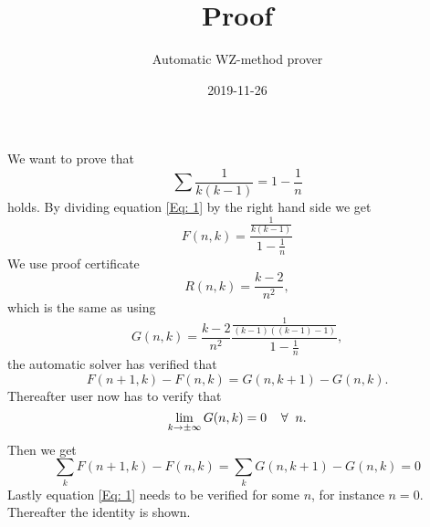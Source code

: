 \documentclass{article}
\title{Proof}
\author{Automatic WZ-method prover}
\date{2019-11-26}
\let\oldforall\forall
\renewcommand{\forall}{\hspace*{2mm}\oldforall\hspace*{1mm}}
\begin{document}
\maketitle
We want to prove that
\begin{equation}\label{Eq: 1}
\sum \frac{1}{k(k-1)} = 1-\frac{1}{n}
\end{equation}
holds. By dividing equation \ref{Eq: 1} by the right hand side we get
\begin{equation}
F(n,k)=\frac{\frac{1}{k(k-1)}}{1-\frac{1}{n}}
\end{equation}
We use proof certificate
\begin{equation}
R(n,k)=\frac{k-2}{n^2},
\end{equation}
which is the same as using
\begin{equation}
G(n,k)=\frac{k-2}{n^2}\frac{\frac{1}{(k-1)((k-1)-1)}}{1-\frac{1}{n}},
\end{equation}
the automatic solver has  verified that
\begin{equation}\label{Eq: WZ1}
F(n+1,k)-F(n,k)=G(n,k+1)-G(n,k).
\end{equation}
Thereafter user now has to verify that
\begin{equation}
\lim_{k\to\pm\infty}G(n,k)=0\forall n.
\end{equation}
Then we get
\begin{equation}
\sum_k F(n+1,k)-F(n,k)=\sum_k G(n,k+1)-G(n,k)=0\end{equation}Lastly equation \ref{Eq: 1} needs to be verified for some $n$, for instance $n=0$. Thereafter the identity is shown.
\end{document}
